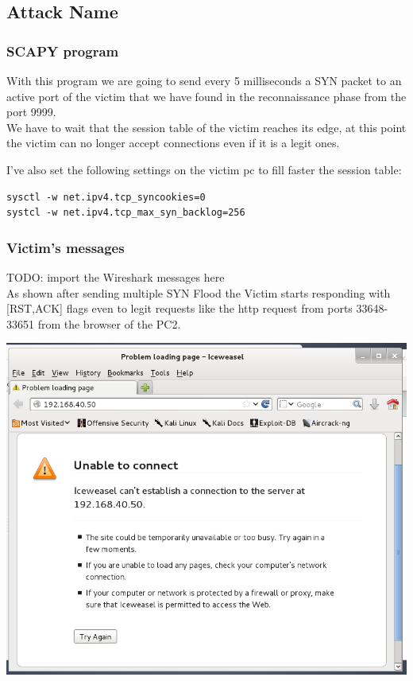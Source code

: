 \subsection{Attack Name}
\subsubsection{SCAPY program}

With this program we are going to send every 5 milliseconds a SYN packet to an active port of the victim that we have found in the reconnaissance phase from the port 9999.\\
We have to wait that the session table of the victim reaches its edge, at this point the victim can no longer accept connections even if it is a legit ones.\par
I’ve also set the following settings on the victim pc to fill faster the session table:\\
\begin{lstlisting}
sysctl -w net.ipv4.tcp_syncookies=0
systcl -w net.ipv4.tcp_max_syn_backlog=256
\end{lstlisting}

\subsubsection{Victim's messages}

{\huge{TODO: import the Wireshark messages here}}\\

As shown after sending multiple SYN Flood the Victim starts responding with [RST,ACK] flags even to legit requests like the http request from ports 33648-33651 from the browser of the PC2.\par
\includegraphics[width=16cm]{img/SYNFloodResult.png}\par

